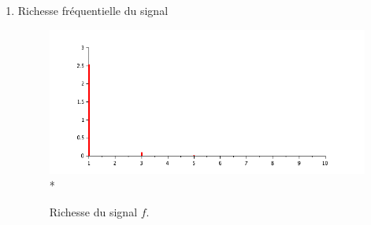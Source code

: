 \documentclass[a4paper,12pt]{report}
\begin{document}
\begin{enumerate}
\begin{enumerate}
			\item Richesse fréquentielle du signal
			\begin{figure}[h!]
				\centering
				\includegraphics[scale=0.6]{ex1_fig5_2.png}\\*
				\caption{\label{ex1_figure5_2}Richesse du signal $f$.}
			\end{figure}\\
		\end{enumerate}

		
	\end{enumerate}
\newpage



	

\end{document}
